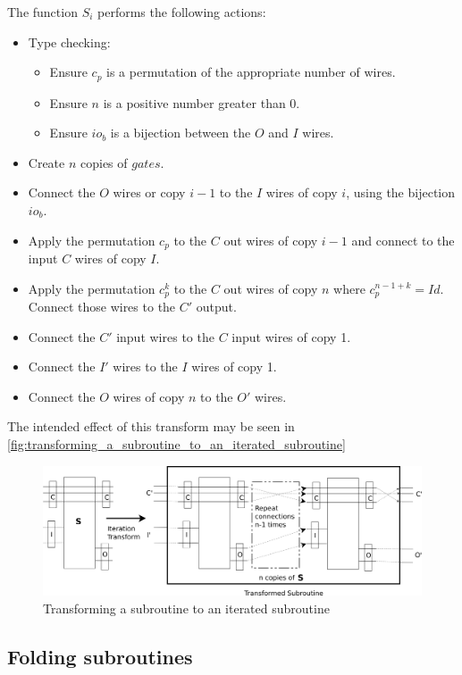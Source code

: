 The function $S_i$ performs the following actions:
\begin{itemize}
  \item Type checking:
  \begin{itemize}
    \item Ensure  $c_p$ is a permutation of the appropriate number of wires.
    \item Ensure $n$ is a positive number greater than 0.
    \item Ensure $io_b$ is a bijection between the $O$ and $I$ wires.
  \end{itemize}
  \item Create $n$ copies of $gates$.
  \item Connect the $O$ wires or copy $i-1$ to the $I$ wires of copy $i$,
  using the bijection $io_b$.
  \item Apply the permutation $c_p$ to the $C$ out wires of copy $i-1$
  and connect to the input $C$ wires of copy $I$.
  \item Apply the permutation $c_p^k$ to the $C$ out wires of copy $n$
  where $c_p^{n-1+k} = Id$. Connect those wires to the $C'$ output.
  \item Connect the $C'$ input wires to the $C$ input wires of copy 1.
  \item Connect the $I'$ wires to the $I$ wires of copy 1.
  \item Connect the $O$ wires of copy $n$ to the $O'$ wires.
\end{itemize}

The intended effect of this transform may be seen in
\vref{fig:transforming_a_subroutine_to_an_iterated_subroutine}
\begin{figure}[htbp]
  \centering
     \includegraphics[scale=.4]{diagrams/SubroutineIterationTransform.png}
   \caption{Transforming a subroutine to an iterated subroutine}
   \label{fig:transforming_a_subroutine_to_an_iterated_subroutine}
\end{figure}

\subsection{Folding subroutines} %
\label{sub:folding_subroutines}

